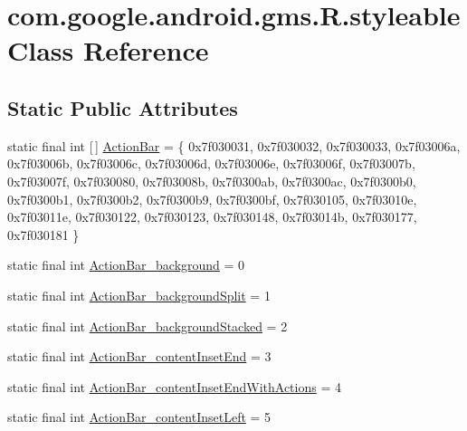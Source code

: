 \hypertarget{classcom_1_1google_1_1android_1_1gms_1_1R_1_1styleable}{}\section{com.\+google.\+android.\+gms.\+R.\+styleable Class Reference}
\label{classcom_1_1google_1_1android_1_1gms_1_1R_1_1styleable}
\subsection*{Static Public Attributes}
\begin{DoxyCompactItemize}
\item 
static final int \mbox{[}$\,$\mbox{]} \mbox{\hyperlink{classcom_1_1google_1_1android_1_1gms_1_1R_1_1styleable_a5d4dbe64fcbf0c53965cf1482882edab}{Action\+Bar}} = \{ 0x7f030031, 0x7f030032, 0x7f030033, 0x7f03006a, 0x7f03006b, 0x7f03006c, 0x7f03006d, 0x7f03006e, 0x7f03006f, 0x7f03007b, 0x7f03007f, 0x7f030080, 0x7f03008b, 0x7f0300ab, 0x7f0300ac, 0x7f0300b0, 0x7f0300b1, 0x7f0300b2, 0x7f0300b9, 0x7f0300bf, 0x7f030105, 0x7f03010e, 0x7f03011e, 0x7f030122, 0x7f030123, 0x7f030148, 0x7f03014b, 0x7f030177, 0x7f030181 \}
\item 
static final int \mbox{\hyperlink{classcom_1_1google_1_1android_1_1gms_1_1R_1_1styleable_a8b125c61d527d0d6cf743568dd5ba727}{Action\+Bar\+\_\+background}} = 0
\item 
static final int \mbox{\hyperlink{classcom_1_1google_1_1android_1_1gms_1_1R_1_1styleable_ac3c2d5ddcd88be1a3a2d8b4b751193b3}{Action\+Bar\+\_\+background\+Split}} = 1
\item 
static final int \mbox{\hyperlink{classcom_1_1google_1_1android_1_1gms_1_1R_1_1styleable_aab3dc46d9b7c28d1a9b7085174f651b6}{Action\+Bar\+\_\+background\+Stacked}} = 2
\item 
static final int \mbox{\hyperlink{classcom_1_1google_1_1android_1_1gms_1_1R_1_1styleable_a8e6934a8aa8641b3ee793d2308c53602}{Action\+Bar\+\_\+content\+Inset\+End}} = 3
\item 
static final int \mbox{\hyperlink{classcom_1_1google_1_1android_1_1gms_1_1R_1_1styleable_a3566a6153dbadaaa93dae4177693049b}{Action\+Bar\+\_\+content\+Inset\+End\+With\+Actions}} = 4
\item 
static final int \mbox{\hyperlink{classcom_1_1google_1_1android_1_1gms_1_1R_1_1styleable_a81058276ada217e9c70c7964ffb79751}{Action\+Bar\+\_\+content\+Inset\+Left}} = 5
\item 

\end{DoxyCompactItemize}
